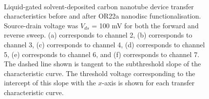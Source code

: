 \documentclass[
  a4paper,
]{scrbook}
\begin{document}
\begin{figure}
\begin{minipage}[t]{0.45\linewidth}
{{}

}

\end{minipage}%
%
\begin{minipage}[t]{0.01\linewidth}

{\centering 

~

}

\end{minipage}%

\caption[Liquid-gated solvent-deposited carbon nanotube device transfer
characteristics before and after OR22a nanodisc functionalisation, with
the threshold voltage shown for each transfer characteristic
curve.]{\label{fig-solvent-deposited-sensing-TX}Liquid-gated
solvent-deposited carbon nanotube device transfer characteristics before
and after OR22a nanodisc functionalisation. Source-drain voltage was
\(V_{ds}\) = 100 mV for both the forward and reverse sweep. (a)
corresponds to channel 2, (b) corresponds to channel 3, (c) corresponds
to channel 4, (d) corresponds to channel 5, (e) corresponds to channel
6, and (f) corresponds to channel 7. The dashed line shown is tangent to
the subthreshold slope of the characteristic curve. The threshold
voltage corresponding to the intercept of this slope with the \(x\)-axis
is shown for each transfer characteristic curve.}

\end{figure}
\end{document}
